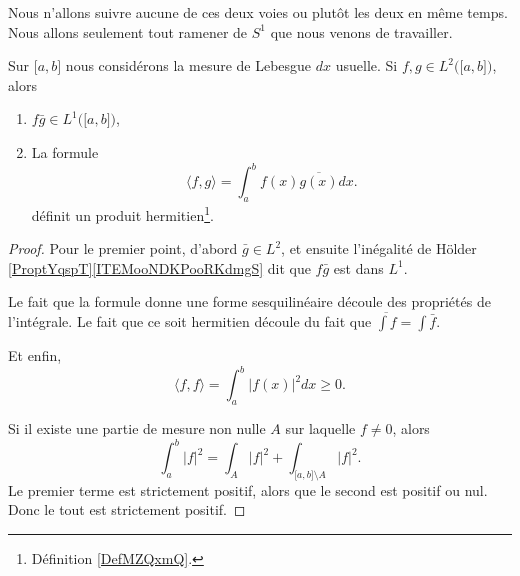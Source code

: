 Nous n'allons suivre aucune de ces deux voies ou plutôt les deux en même temps. Nous allons seulement tout ramener de \( S^1\) que nous venons de travailler.

\begin{propositionDef}
	Sur \( \mathopen[ a , b \mathclose]\) nous considérons la mesure de Lebesgue \( dx\) usuelle. Si \( f,g\in L^2\big( \mathopen[ a , b \mathclose] \big)\), alors
	\begin{enumerate}
		\item
		      \( f\bar g\in L^1\big( \mathopen[ a , b \mathclose] \big)\),
		\item
		      La formule
		      \begin{equation}    \label{EQooCRSXooPEopzm}
			      \langle f, g\rangle =\int_a^bf(x)\overline{ g(x) }dx.
		      \end{equation}
		      définit un produit hermitien\footnote{Définition \ref{DefMZQxmQ}.}.
	\end{enumerate}
\end{propositionDef}

\begin{proof}
	Pour le premier point, d'abord \( \bar g\in L^2\), et ensuite l'inégalité de Hölder \ref{ProptYqspT}\ref{ITEMooNDKPooRKdmgS} dit que \( f\bar g\) est dans \( L^1\).

	Le fait que la formule donne une forme sesquilinéaire découle des propriétés de l'intégrale. Le fait que ce soit hermitien découle du fait que \( \overline{ \int f }=\int\bar f\).

	Et enfin,
	\begin{equation}
		\langle f,f \rangle =\int_a^b| f(x) |^2dx\geq 0.
	\end{equation}

	Si il existe une partie de mesure non nulle \( A\) sur laquelle \( f\neq 0\), alors
	\begin{equation}
		\int_a^b| f |^2=\int_A| f |^2+\int_{\mathopen[ a , b \mathclose]\setminus A}| f |^2.
	\end{equation}
	Le premier terme est strictement positif, alors que le second est positif ou nul. Donc le tout est strictement positif.
\end{proof}

